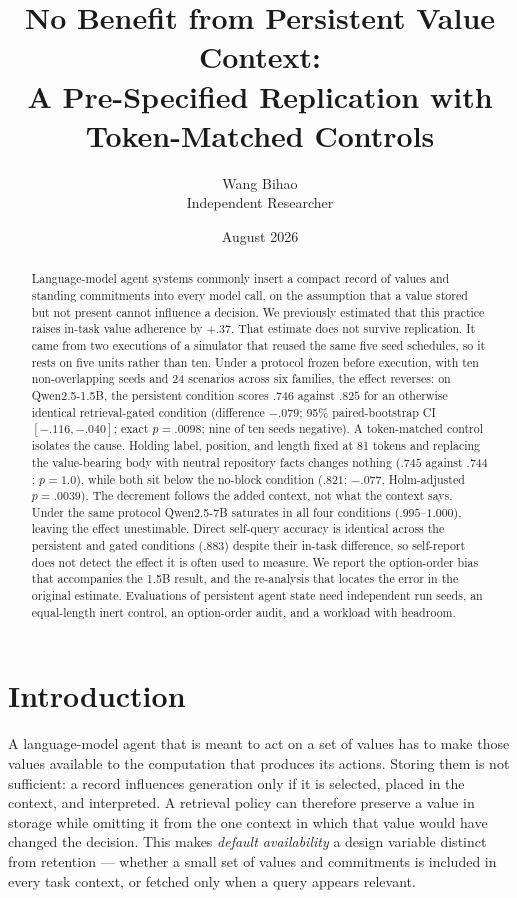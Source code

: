 \documentclass[11pt]{article}
\title{\textbf{No Benefit from Persistent Value Context:\\A Pre-Specified Replication with Token-Matched Controls}}
\author{Wang Bihao\\
Independent Researcher}
\date{August 2026}
\begin{document}
\maketitle

\begin{abstract}
Language-model agent systems commonly insert a compact record of values and standing commitments into every model call, on the assumption that a value stored but not present cannot influence a decision. We previously estimated that this practice raises in-task value adherence by $+.37$. That estimate does not survive replication. It came from two executions of a simulator that reused the same five seed schedules, so it rests on five units rather than ten. Under a protocol frozen before execution, with ten non-overlapping seeds and 24 scenarios across six families, the effect reverses: on Qwen2.5-1.5B, the persistent condition scores $.746$ against $.825$ for an otherwise identical retrieval-gated condition (difference $-.079$; 95\% paired-bootstrap CI $[-.116,-.040]$; exact $p=.0098$; nine of ten seeds negative). A token-matched control isolates the cause. Holding label, position, and length fixed at 81 tokens and replacing the value-bearing body with neutral repository facts changes nothing ($.745$ against $.744$; $p=1.0$), while both sit below the no-block condition ($.821$; $-.077$, Holm-adjusted $p=.0039$). The decrement follows the added context, not what the context says. Under the same protocol Qwen2.5-7B saturates in all four conditions ($.995$--$1.000$), leaving the effect unestimable. Direct self-query accuracy is identical across the persistent and gated conditions ($.883$) despite their in-task difference, so self-report does not detect the effect it is often used to measure. We report the option-order bias that accompanies the 1.5B result, and the re-analysis that locates the error in the original estimate. Evaluations of persistent agent state need independent run seeds, an equal-length inert control, an option-order audit, and a workload with headroom.
\end{abstract}

\section{Introduction}
A language-model agent that is meant to act on a set of values has to make those values available to the computation that produces its actions. Storing them is not sufficient: a record influences generation only if it is selected, placed in the context, and interpreted. A retrieval policy can therefore preserve a value in storage while omitting it from the one context in which that value would have changed the decision. This makes \emph{default availability} a design variable distinct from retention --- whether a small set of values and commitments is included in every task context, or fetched only when a query appears relevant.
\end{document}
